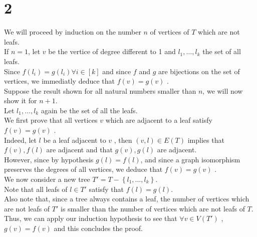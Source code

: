 \documentclass[11pt, a4paper]{article}
\begin{document}
\section*{2}
We will proceed by induction on the number $n$  of vertices of $T$ which are not leafs.\\
If $n=1$, let $v$ be the vertice of degree different to 1 and $l_1, \ldots, l_k$ the set of all leafs.\\
Since $ f( l_i) = g( l_i) \forall i \in [ k]  $ and since $f$ and $g$ are bijections on the set of vertices, we immediatly deduce that $f( v) = g( v) $ .\\
Suppose the result shown for all natural numbers smaller than $n$, we will now show it for $n+1$.\\
Let $l_1, \ldots, l_k$ again be the set of all the leafs.\\
We first prove that all vertices $v$  which are adjacent to a leaf satisfy $f( v) = g( v) $ .\\
Indeed, let $l$ be a leaf adjacent to $v$ , then $( v,l) \in E( T) $ implies that $f(v) , f( l) $ are adjacent and that $g( v) , g( l) $ are adjacent.\\
However, since by hypothesis $g( l) = f( l) $, and since a graph isomorphism preserves the degrees of all vertices, we deduce that $f( v) = g( v) $ .\\
We now consider a new tree $T' = T - \left\{ l_1, \ldots, l_k \right\} $.\\
Note that all leafs of $l \in T'$ satisfy that $ f( l) = g( l) $.\\
Also note that, since a tree always contains a leaf, the number of vertices which are not leafs of $T'$ is smaller than the number of vertices which are not leafs of $T$.\\
Thus, we can apply our induction hypothesis to see that $\forall v \in V(  T')$ , $g( v) = f( v) $ and this concludes the proof.
\end{document}
